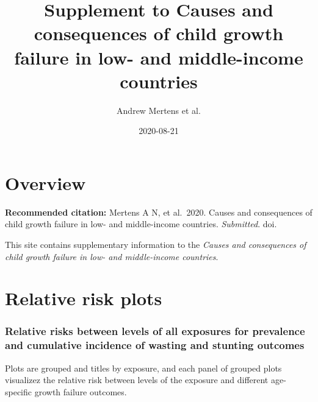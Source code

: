 \documentclass[
  9pt,
]{book}
\title{Supplement to Causes and consequences of child growth failure in low- and middle-income countries}
\author{Andrew Mertens et al.}
\date{2020-08-21}
\begin{document}
\maketitle

{
\setcounter{tocdepth}{1}
\tableofcontents
}
\hypertarget{overview}{%
\chapter{Overview}\label{overview}}

\textbf{Recommended citation:} Mertens A N, et al.~2020. Causes and consequences of child growth failure in low- and middle-income countries. \emph{Submitted}. doi.

This site contains supplementary information to the \emph{Causes and consequences of child growth failure in low- and middle-income countries}.

\hypertarget{RR}{%
\chapter{Relative risk plots}\label{RR}}

\raggedright

\hypertarget{relative-risks-between-levels-of-all-exposures-for-prevalence-and-cumulative-incidence-of-wasting-and-stunting-outcomes}{%
\subsection{Relative risks between levels of all exposures for prevalence and cumulative incidence of wasting and stunting outcomes}\label{relative-risks-between-levels-of-all-exposures-for-prevalence-and-cumulative-incidence-of-wasting-and-stunting-outcomes}}

Plots are grouped and titles by exposure, and each panel of grouped plots visualizez the relative risk between levels of the exposure and different age-specific growth failure outcomes.
\end{document}
